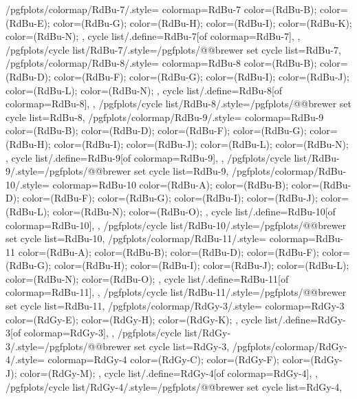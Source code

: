 {  %
  /pgfplots/colormap/RdBu-7/.style={
    colormap={RdBu-7}{
      color=(RdBu-B);
      color=(RdBu-E);
      color=(RdBu-G);
      color=(RdBu-H);
      color=(RdBu-I);
      color=(RdBu-K);
      color=(RdBu-N);
    },
    cycle list/.define={RdBu-7}{[of colormap=RdBu-7]},
  },
  /pgfplots/cycle list/RdBu-7/.style={/pgfplots/@@brewer set cycle list={RdBu-7}},
  /pgfplots/colormap/RdBu-8/.style={
    colormap={RdBu-8}{
      color=(RdBu-B);
      color=(RdBu-D);
      color=(RdBu-F);
      color=(RdBu-G);
      color=(RdBu-I);
      color=(RdBu-J);
      color=(RdBu-L);
      color=(RdBu-N);
    },
    cycle list/.define={RdBu-8}{[of colormap=RdBu-8]},
  },
  /pgfplots/cycle list/RdBu-8/.style={/pgfplots/@@brewer set cycle list={RdBu-8}},
  /pgfplots/colormap/RdBu-9/.style={
    colormap={RdBu-9}{
      color=(RdBu-B);
      color=(RdBu-D);
      color=(RdBu-F);
      color=(RdBu-G);
      color=(RdBu-H);
      color=(RdBu-I);
      color=(RdBu-J);
      color=(RdBu-L);
      color=(RdBu-N);
    },
    cycle list/.define={RdBu-9}{[of colormap=RdBu-9]},
  },
  /pgfplots/cycle list/RdBu-9/.style={/pgfplots/@@brewer set cycle list={RdBu-9}},
  /pgfplots/colormap/RdBu-10/.style={
    colormap={RdBu-10}{
      color=(RdBu-A);
      color=(RdBu-B);
      color=(RdBu-D);
      color=(RdBu-F);
      color=(RdBu-G);
      color=(RdBu-I);
      color=(RdBu-J);
      color=(RdBu-L);
      color=(RdBu-N);
      color=(RdBu-O);
    },
    cycle list/.define={RdBu-10}{[of colormap=RdBu-10]},
  },
  /pgfplots/cycle list/RdBu-10/.style={/pgfplots/@@brewer set cycle list={RdBu-10}},
  /pgfplots/colormap/RdBu-11/.style={
    colormap={RdBu-11}{
      color=(RdBu-A);
      color=(RdBu-B);
      color=(RdBu-D);
      color=(RdBu-F);
      color=(RdBu-G);
      color=(RdBu-H);
      color=(RdBu-I);
      color=(RdBu-J);
      color=(RdBu-L);
      color=(RdBu-N);
      color=(RdBu-O);
    },
    cycle list/.define={RdBu-11}{[of colormap=RdBu-11]},
  },
  /pgfplots/cycle list/RdBu-11/.style={/pgfplots/@@brewer set cycle list={RdBu-11}},
  /pgfplots/colormap/RdGy-3/.style={
    colormap={RdGy-3}{
      color=(RdGy-E);
      color=(RdGy-H);
      color=(RdGy-K);
    },
    cycle list/.define={RdGy-3}{[of colormap=RdGy-3]},
  },
  /pgfplots/cycle list/RdGy-3/.style={/pgfplots/@@brewer set cycle list={RdGy-3}},
  /pgfplots/colormap/RdGy-4/.style={
    colormap={RdGy-4}{
      color=(RdGy-C);
      color=(RdGy-F);
      color=(RdGy-J);
      color=(RdGy-M);
    },
    cycle list/.define={RdGy-4}{[of colormap=RdGy-4]},
  },
  /pgfplots/cycle list/RdGy-4/.style={/pgfplots/@@brewer set cycle list={RdGy-4}},
}
